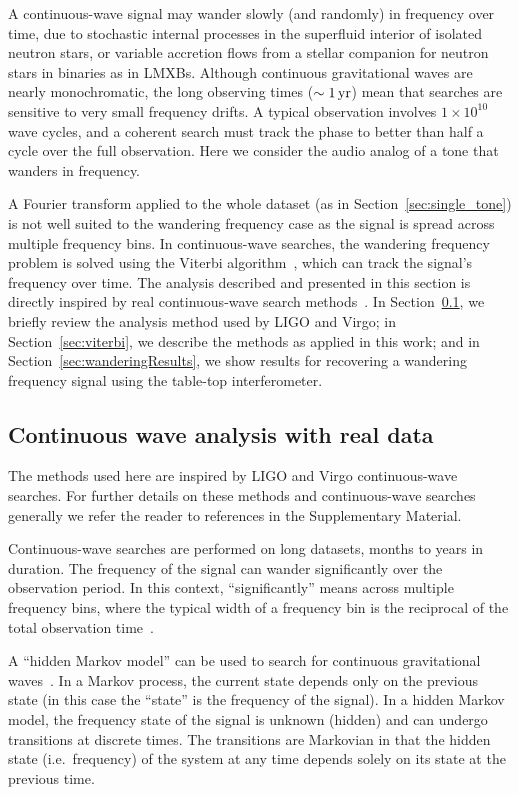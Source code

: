 \documentclass[paper-main.tex]{subfiles}
\begin{document}
A continuous-wave signal may wander slowly (and randomly) in frequency over time, due to stochastic internal processes in the superfluid interior of isolated neutron stars, or variable accretion flows from a stellar companion for neutron stars in binaries as in LMXBs.
Although continuous gravitational waves are nearly monochromatic, the long observing times ($\sim 1\,{\rm yr}$) mean that searches are sensitive to very small frequency drifts. 
A typical observation involves $1 \times 10^{10}$ wave cycles, and a coherent search must track the phase to better than half a cycle over the full observation. 
Here we consider the audio analog of a tone that wanders in frequency. 



A Fourier transform applied to the whole dataset (as in Section~\ref{sec:single_tone}) is not well suited to the wandering frequency case as the signal is spread across multiple frequency bins. 
In continuous-wave searches, the wandering frequency problem is solved using the Viterbi algorithm~\cite{Viterbi:1967}, which can track the signal's frequency over time.
The analysis described and presented in this section is directly inspired by real continuous-wave search methods~\cite{SuvorovaEtAl:2017}. 
In Section~\ref{sec:realCWSearches}, we briefly review the analysis method used by LIGO and Virgo; in Section~\ref{sec:viterbi}, we describe the methods as applied in this work; and in Section~\ref{sec:wanderingResults}, we show results for recovering a wandering frequency signal using the table-top interferometer. 


\subsection{Continuous wave analysis with real data}
\label{sec:realCWSearches}


The methods used here are inspired by LIGO and Virgo continuous-wave searches. 
For further details on these methods and continuous-wave searches generally we refer the reader to references in the Supplementary Material. 


Continuous-wave searches are performed on long datasets, months to years in duration. 
The frequency of the signal can wander significantly over the observation period. 
In this context, ``significantly'' means across multiple frequency bins, where the typical width of a frequency bin is the reciprocal of the total observation time~\cite{JKS:1998,ScoX1O2Viterbi:2019}.


A ``hidden Markov model'' can be used to search for continuous gravitational waves~\cite{SuvorovaEtAl:2017}. 
In a Markov process, the current state depends only on the previous state (in this case the ``state'' is the frequency of the signal). 
In a hidden Markov model, the frequency state of the signal is unknown (hidden) and can undergo transitions at discrete times. 
The transitions are Markovian in that the hidden state (i.e.\ frequency) of the system at any time depends solely on its state at the previous time. 
\end{document}
